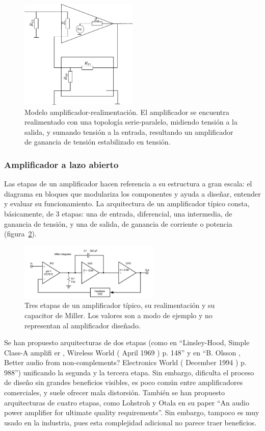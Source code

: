 \documentclass[a4paper,12pt,twoside]{article}
\begin{document}
\begin{figure}[H]
	\centering
	\includegraphics[width=0.5\textwidth]{img/realimentacion}
	\caption{Modelo amplificador-realimentación. El amplificador se encuentra realimentado con una topología serie-paralelo, midiendo tensión a la salida, y sumando tensión a la entrada, resultando un amplificador de ganancia de tensión estabilizado en tensión.}
	\label{fig:ampli_realimentacion}
\end{figure}


\subsubsection{Amplificador a lazo abierto}

Las etapas de un amplificador hacen referencia a su estructura a gran escala: el diagrama en bloques que modulariza los componentes y ayuda a diseñar, entender y evaluar su funcionamiento. La arquitectura de un amplificador típico consta, básicamente, de 3 etapas: una de entrada, diferencial, una intermedia, de ganancia de tensión, y una de salida, de ganancia de corriente o potencia (figura~\ref{fig:etapas}).

\begin{figure}[H]
	\centering
	\includegraphics[width=0.6\textwidth]{img/etapas}
	\caption{Tres etapas de un amplificador típico, su realimentación y su capacitor de Miller. Los valores son a modo de ejemplo y no representan al amplificador diseñado.}
	\label{fig:etapas}
\end{figure}


Se han propuesto arquitecturas de dos etapas (como en ``Linsley-Hood, Simple Class-A amplifi er , Wireless World ( April 1969 ) p. 148'' y en ``B. Olsson , Better audio from non-complements? Electronics World ( December 1994 ) p. 988'') unificando la segunda y la tercera etapa. Sin embargo, dificulta el proceso de diseño sin grandes beneficios visibles, es poco común entre amplificadores comerciales, y suele ofrecer mala distorsión. También se han propuesto arquitecturas de cuatro etapas, como Lohstroh y Otala en su paper ``An audio power amplifier for ultimate quality requirements''. Sin embargo, tampoco es muy usado en la industria, pues esta complejidad adicional no parece traer beneficios.
\end{document}
